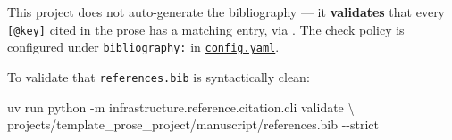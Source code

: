\documentclass[
]{article}
\newenvironment{Shaded}{}{}
\newcommand{\AttributeTok}[1]{\textcolor[rgb]{0.49,0.56,0.16}{#1}}
\newcommand{\DataTypeTok}[1]{\textcolor[rgb]{0.56,0.13,0.00}{#1}}
\newcommand{\ExtensionTok}[1]{#1}
\newcommand{\NormalTok}[1]{#1}
\begin{document}
This project does not auto-generate the bibliography --- it
\textbf{validates} that every \texttt{{[}@key{]}} cited in the prose has
a matching entry, via
\href{../../../infrastructure/reference/citation/SKILL.md}{}.
The check policy is configured under \texttt{bibliography:} in
\href{config.yaml}{\texttt{config.yaml}}.

To validate that \texttt{references.bib} is syntactically clean:

\begin{Shaded}
\begin{Highlighting}[]
\ExtensionTok{uv}\NormalTok{ run python }\AttributeTok{{-}m}\NormalTok{ infrastructure.reference.citation.cli validate }\DataTypeTok{\textbackslash{}}
\NormalTok{    projects/template\_prose\_project/manuscript/references.bib }\AttributeTok{{-}{-}strict}
\end{Highlighting}
\end{Shaded}




\clearpage


\end{document}
